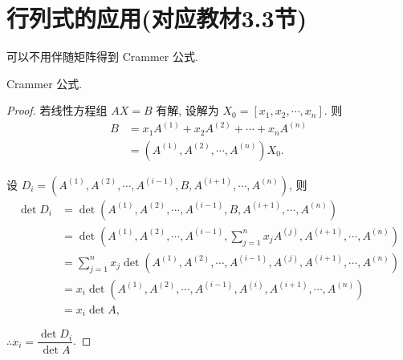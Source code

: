 \documentclass{ctexart}
\begin{document}
\section{行列式的应用(对应教材3.3节)}
可以不用伴随矩阵得到 Crammer 公式.
\begin{theorem}[书上的定理 2]
    Crammer 公式.
\end{theorem}
\begin{proof}
    若线性方程组 $AX=B$ 有解, 设解为 $X_0=[x_1,x_2,\cdots,x_n]$. 则
    \begin{align*}
        B & =x_1A^{(1)}+x_2A^{(2)}+\cdots+x_nA^{(n)} \\
        & =(A^{(1)},A^{(2)},\cdots,A^{(n)})X_0.
    \end{align*}

    设 $D_i=(A^{(1)},A^{(2)},\cdots,A^{(i-1)},B,A^{(i+1)},\cdots,A^{(n)})$, 则
    \begin{align*}
        \det D_i & =\det\left(A^{(1)},A^{(2)},\cdots,A^{(i-1)},B,A^{(i+1)},\cdots,A^{(n)}\right) \\
        & =\det\left(A^{(1)},A^{(2)},\cdots,A^{(i-1)},\sum\limits_{j=1}^nx_jA^{(j)},A^{(i+1)},\cdots,A^{(n)}\right) \\
        & =\sum\limits_{j=1}^nx_j\det\left(A^{(1)},A^{(2)},\cdots,A^{(i-1)},A^{(j)},A^{(i+1)},\cdots,A^{(n)}\right) \\
        & =x_i\det\left(A^{(1)},A^{(2)},\cdots,A^{(i-1)},A^{(i)},A^{(i+1)},\cdots,A^{(n)}\right) \\
        & =x_i\det A,
    \end{align*}

    $\therefore x_i=\dfrac{\det D_i}{\det A}$.
\end{proof}
\end{document}
